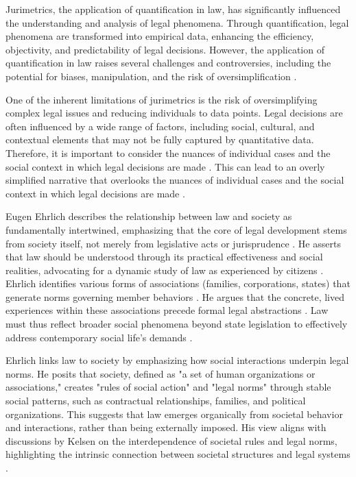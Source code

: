 Jurimetrics, the application of quantification in law, has significantly influenced the understanding and analysis of legal phenomena. Through quantification, legal phenomena are transformed into empirical data, enhancing the efficiency, objectivity, and predictability of legal decisions. However, the application of quantification in law raises several challenges and controversies, including the potential for biases, manipulation, and the risk of oversimplification \cite{nunes2018, colombo2017}.

One of the inherent limitations of jurimetrics is the risk of oversimplifying complex legal issues and reducing individuals to data points. Legal decisions are often influenced by a wide range of factors, including social, cultural, and contextual elements that may not be fully captured by quantitative data. Therefore, it is important to consider the nuances of individual cases and the social context in which legal decisions are made \cite{10.1007/s11186-021-09453-1,10.1057/s41599-020-00557-0}. This can lead to an overly simplified narrative that overlooks the nuances of individual cases and the social context in which legal decisions are made \cite{10.1007/s11186-021-09453-1,10.1057/s41599-020-00557-0}.

Eugen Ehrlich describes the relationship between law and society as fundamentally intertwined, emphasizing that the core of legal development stems from society itself, not merely from legislative acts or jurisprudence \cite{konzen2024}. He asserts that law should be understood through its practical effectiveness and social realities, advocating for a dynamic study of law as experienced by citizens \cite{konzen2024}. Ehrlich identifies various forms of associations (families, corporations, states) that generate norms governing member behaviors \cite{konzen2024}. He argues that the concrete, lived experiences within these associations precede formal legal abstractions \cite{konzen2024}. Law must thus reflect broader social phenomena beyond state legislation to effectively address contemporary social life’s demands \cite{konzen2024}.

Ehrlich links law to society by emphasizing how social interactions underpin legal norms. He posits that society, defined as "a set of human organizations or associations," creates "rules of social action" and "legal norms" through stable social patterns, such as contractual relationships, families, and political organizations. This suggests that law emerges organically from societal behavior and interactions, rather than being externally imposed. His view aligns with discussions by Kelsen on the interdependence of societal rules and legal norms, highlighting the intrinsic connection between societal structures and legal systems \cite{konzen2024}.

